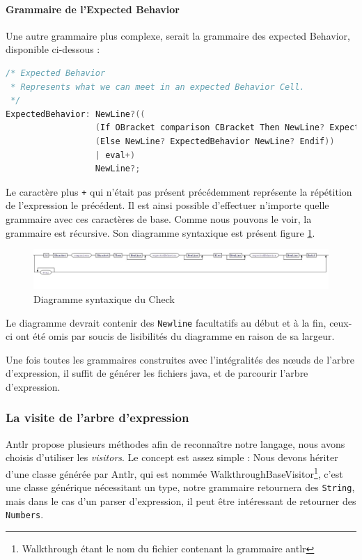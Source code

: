 		\paragraph{Grammaire de l'Expected Behavior}
		Une autre grammaire plus complexe, serait la grammaire des expected Behavior, disponible ci-dessous : 
\begin{lstlisting}[caption=Grammaire Check, numbers=none, language=C]
/* Expected Behavior 
 * Represents what we can meet in an expected Behavior Cell.
 */
ExpectedBehavior: NewLine?((
                  (If OBracket comparison CBracket Then NewLine? ExpectedBehavior NewLine?)
                  (Else NewLine? ExpectedBehavior NewLine? Endif))
                  | eval+)
                  NewLine?;
\end{lstlisting}
Le caractère plus \texttt{+} qui n'était pas présent précédemment représente la répétition de l'expression le précédent. Il est ainsi possible d'effectuer
n'importe quelle grammaire avec ces caractères de base. Comme nous pouvons le voir, la grammaire est récursive. Son diagramme syntaxique est présent figure \ref{fig:diagSynEB}.
\begin{figure}[H]
	\centering
		\hspace*{-40px}
	\includegraphics[width=20cm]{contents/images/expectedBehaviorGrammar.jpg}
	\caption{Diagramme syntaxique du Check}
	\label{fig:diagSynEB}
\end{figure}
\begin{remarque}
Le diagramme devrait contenir des \texttt{Newline} facultatifs au début et à la fin, ceux-ci ont été omis par soucis de lisibilités du diagramme en raison de sa largeur.
\end{remarque}

Une fois toutes les grammaires construites avec l'intégralités des n\oe{}uds de l'arbre d'expression, il suffit de générer les fichiers java, et de parcourir l'arbre d'expression.

	\subsubsection{La visite de l'arbre d'expression}
	Antlr propose plusieurs méthodes afin de reconnaître notre langage, nous avons choisis d'utiliser les \textit{visitors}. Le concept est assez simple : Nous
	devons hériter d'une classe générée par Antlr, qui est nommée WalkthroughBaseVisitor\footnote{Walkthrough étant le nom du fichier contenant la grammaire antlr}, c'est une classe générique nécessitant un type, notre grammaire retournera des \texttt{String}, mais dans le cas d'un parser d'expression, il peut être intéressant de retourner des \texttt{Numbers}.

